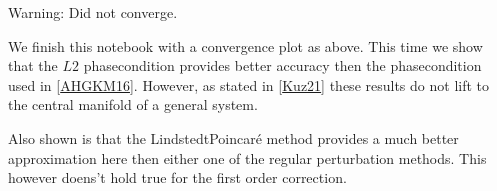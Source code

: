 \documentclass[letterpaper,10pt,english]{jupyterBook}
\begin{document}
\begin{sphinxVerbatim}[commandchars=\\\{\}]
Warning: Did not converge.
\end{sphinxVerbatim}

\noindent{}

\sphinxAtStartPar
We finish this notebook with a convergence plot as above. This time we show
that the \(L2\) phase\sphinxhyphen{}condition provides better accuracy then  the phase\sphinxhyphen{}condition
used in {[}\hyperlink{cite.references:id2}{AHGKM16}{]}. However, as stated in {[}\hyperlink{cite.references:id3}{Kuz21}{]}
these results do not lift to the central manifold of a general system.

\sphinxAtStartPar
Also shown is that the Lindstedt\sphinxhyphen{}Poincaré method provides a much better
approximation here then either one of the regular perturbation methods.
This however doens’t hold true for the first order correction.
\end{document}
